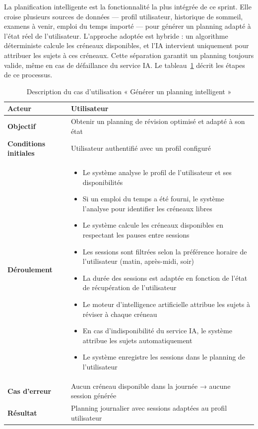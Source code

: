 La planification intelligente est la fonctionnalité la plus intégrée de ce sprint. Elle croise plusieurs sources de données — profil utilisateur, historique de sommeil, examens à venir, emploi du temps importé — pour générer un planning adapté à l'état réel de l'utilisateur. L'approche adoptée est hybride : un algorithme déterministe calcule les créneaux disponibles, et l'IA intervient uniquement pour attribuer les sujets à ces créneaux. Cette séparation garantit un planning toujours valide, même en cas de défaillance du service IA. Le tableau~\ref{tab:uc_planning} décrit les étapes de ce processus.

\begin{table}[H]
\centering
\renewcommand{\arraystretch}{1.2}
\begin{tabular}{|p{4cm}|p{10cm}|}
\hline
\textbf{Acteur} & Utilisateur \\ \hline
\textbf{Objectif} & Obtenir un planning de révision optimisé et adapté à
                    son état \\ \hline
\textbf{Conditions initiales} & Utilisateur authentifié avec un profil
                                 configuré \\ \hline
\textbf{Déroulement} &
\begin{itemize}
    \item Le système analyse le profil de l'utilisateur et ses disponibilités
    \item Si un emploi du temps a été fourni, le système l'analyse pour identifier les créneaux libres
    \item Le système calcule les créneaux disponibles en respectant les pauses entre sessions
    \item Les sessions sont filtrées selon la préférence horaire de l'utilisateur (matin, après-midi, soir)
    \item La durée des sessions est adaptée en fonction de l'état de récupération de l'utilisateur
    \item Le moteur d'intelligence artificielle attribue les sujets à réviser à chaque créneau
    \item En cas d'indisponibilité du service IA, le système attribue les sujets automatiquement
    \item Le système enregistre les sessions dans le planning de l'utilisateur
\end{itemize} \\ \hline
\textbf{Cas d'erreur} & Aucun créneau disponible dans la journée →
                        aucune session générée \\ \hline
\textbf{Résultat} & Planning journalier avec sessions adaptées au profil
                    utilisateur \\ \hline
\end{tabular}
\caption{Description du cas d'utilisation « Générer un planning intelligent »}
\label{tab:uc_planning}
\end{table}

